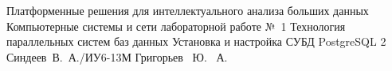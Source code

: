 \makereporttitle
    {Платформенные решения для интеллектуального анализа больших данных}
    {Компьютерные системы и сети}
    {лабораторной работе №~1}
    {Технология параллельных систем баз данных}
    {Установка и настройка СУБД PostgreSQL}
    {2}
    {Синдеев~В.~А./ИУ6-13М}
    {Григорьев ~Ю. ~А.}